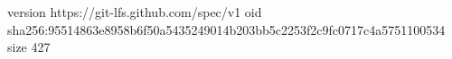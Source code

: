 version https://git-lfs.github.com/spec/v1
oid sha256:95514863e8958b6f50a5435249014b203bb5c2253f2c9fc0717c4a5751100534
size 427

